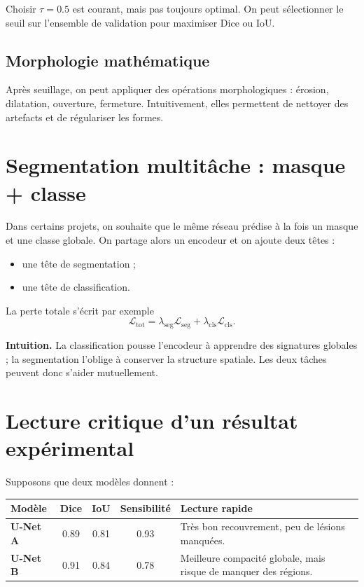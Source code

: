 \documentclass[11pt]{article}
\begin{document}
Choisir $\tau=0.5$ est courant, mais pas toujours optimal. On peut sélectionner le seuil sur l'ensemble de validation pour maximiser Dice ou IoU.

\subsection{Morphologie mathématique}
Après seuillage, on peut appliquer des opérations morphologiques : érosion, dilatation, ouverture, fermeture. Intuitivement, elles permettent de nettoyer des artefacts et de régulariser les formes.

\section{Segmentation multitâche : masque + classe}
Dans certains projets, on souhaite que le même réseau prédise à la fois un masque et une classe globale. On partage alors un encodeur et on ajoute deux têtes :
\begin{itemize}
  \item une tête de segmentation ;
  \item une tête de classification.
\end{itemize}

La perte totale s'écrit par exemple
\[
\mathcal{L}_{\mathrm{tot}} = \lambda_{\mathrm{seg}}\mathcal{L}_{\mathrm{seg}} + \lambda_{\mathrm{cls}}\mathcal{L}_{\mathrm{cls}}.
\]

\begin{ideaBox}
\textbf{Intuition.} La classification pousse l'encodeur à apprendre des signatures globales ; la segmentation l'oblige à conserver la structure spatiale. Les deux tâches peuvent donc s'aider mutuellement.
\end{ideaBox}

\section{Lecture critique d'un résultat expérimental}
Supposons que deux modèles donnent :
\begin{center}
\begin{tabularx}{0.95\textwidth}{>{\bfseries}lcccX}
\toprule
Modèle & Dice & IoU & Sensibilité & Lecture rapide \\
\midrule
U-Net A & 0.89 & 0.81 & 0.93 & Très bon recouvrement, peu de lésions manquées. \\
U-Net B & 0.91 & 0.84 & 0.78 & Meilleure compacité globale, mais risque de manquer des régions. \\
\bottomrule
\end{tabularx}
\end{center}
\end{document}
